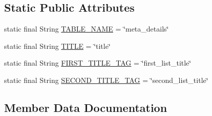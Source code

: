 \subsection*{Static Public Attributes}
\begin{DoxyCompactItemize}
\item 
static final String \hyperlink{classorg_1_1buildmlearn_1_1toolkit_1_1matchtemplate_1_1data_1_1MatchContract_1_1MetaDetails_a12cf1511f7cc5ef964c61dcf490b8f9f}{T\+A\+B\+L\+E\+\_\+\+N\+A\+ME} = \char`\"{}meta\+\_\+details\char`\"{}
\item 
static final String \hyperlink{classorg_1_1buildmlearn_1_1toolkit_1_1matchtemplate_1_1data_1_1MatchContract_1_1MetaDetails_a0f29454366bb795f4f75d9a977bba610}{T\+I\+T\+LE} = \char`\"{}title\char`\"{}
\item 
static final String \hyperlink{classorg_1_1buildmlearn_1_1toolkit_1_1matchtemplate_1_1data_1_1MatchContract_1_1MetaDetails_a837368cf2a76891fa38846c91347af38}{F\+I\+R\+S\+T\+\_\+\+T\+I\+T\+L\+E\+\_\+\+T\+AG} = \char`\"{}first\+\_\+list\+\_\+title\char`\"{}
\item 
static final String \hyperlink{classorg_1_1buildmlearn_1_1toolkit_1_1matchtemplate_1_1data_1_1MatchContract_1_1MetaDetails_a2923111945431d86c32d5d43f6eae841}{S\+E\+C\+O\+N\+D\+\_\+\+T\+I\+T\+L\+E\+\_\+\+T\+AG} = \char`\"{}second\+\_\+list\+\_\+title\char`\"{}
\end{DoxyCompactItemize}


\subsection{Member Data Documentation}
